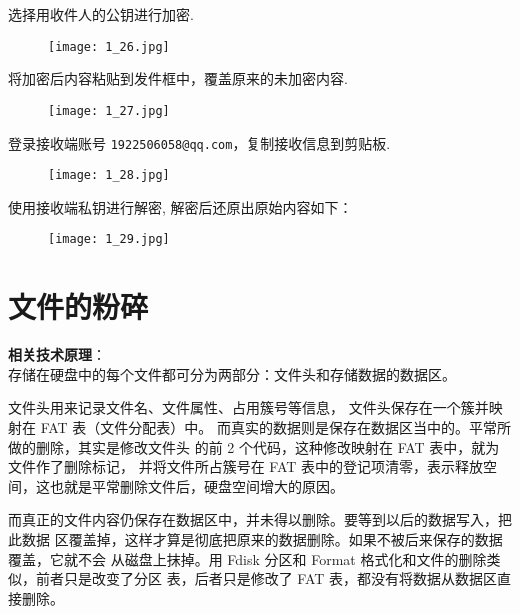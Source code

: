 \documentclass[../main.tex]{subfiles}
\begin{document}
选择用收件人的公钥进行加密.
\begin{figure}[H]
  \begin{center}
    \texttt{[image: 1\_26.jpg]}
  \end{center}
\end{figure}

将加密后内容粘贴到发件框中，覆盖原来的未加密内容.
\begin{figure}[H]
  \begin{center}
    \texttt{[image: 1\_27.jpg]}
  \end{center}
\end{figure}

登录接收端账号 \texttt{1922506058@qq.com}，复制接收信息到剪贴板.
\begin{figure}[H]
  \begin{center}
    \texttt{[image: 1\_28.jpg]}
  \end{center}
\end{figure}

使用接收端私钥进行解密, 解密后还原出原始内容如下：
\begin{figure}[H]
  \begin{center}
    \texttt{[image: 1\_29.jpg]}
  \end{center}
\end{figure}

\section{文件的粉碎}
\textbf{相关技术原理}： \\
存储在硬盘中的每个文件都可分为两部分：文件头和存储数据的数据区。

文件头用来记录文件名、文件属性、占用簇号等信息，
文件头保存在一个簇并映射在 FAT 表（文件分配表）中。
而真实的数据则是保存在数据区当中的。平常所做的删除，其实是修改文件头
的前 2 个代码，这种修改映射在 FAT 表中，就为文件作了删除标记，
并将文件所占簇号在 FAT 表中的登记项清零，表示释放空间，这也就是平常删除文件后，硬盘空间增大的原因。

而真正的文件内容仍保存在数据区中，并未得以删除。要等到以后的数据写入，把此数据
区覆盖掉，这样才算是彻底把原来的数据删除。如果不被后来保存的数据覆盖，它就不会
从磁盘上抹掉。用 Fdisk 分区和 Format 格式化和文件的删除类似，前者只是改变了分区
表，后者只是修改了 FAT 表，都没有将数据从数据区直接删除。
\end{document}
